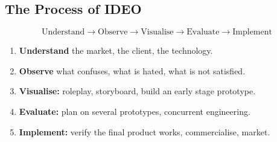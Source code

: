 \documentclass[a4paper,11pt]{article}
\begin{document}
\subsection{The Process of IDEO}
$$
    \text{Understand} \rightarrow \text{Observe} \rightarrow \text{Visualise} \rightarrow \text{Evaluate} \rightarrow \text{Implement}
$$
\begin{enumerate}
    \item   \textbf{Understand} the market, the client, the technology.
    \item   \textbf{Observe} what confuses, what is hated, what is not satisfied.
    \item   \textbf{Visualise:} roleplay, storyboard, build an early stage prototype.
    \item   \textbf{Evaluate:} plan on several prototypes, concurrent engineering.
    \item   \textbf{Implement:} verify the final product works, commercialise, market.
\end{enumerate}
\end{document}
